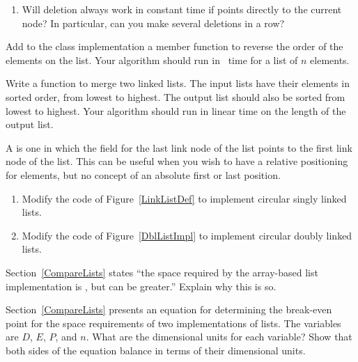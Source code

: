 \begin{exercises}
\begin{enumerate}
\item
Will deletion always work in constant time if  points
directly to the current node?
In particular, can you make several deletions in a row?

\end{enumerate}

\item
Add to the  class implementation a member function
to reverse the order of the elements on the list.
Your algorithm should run in \Thetan\ time for a list of $n$
elements.

\item
Write a function to merge two linked lists.
The input lists have their elements in sorted order, from lowest to
highest.
The output list should also be sorted from lowest to highest.
Your algorithm should run in linear time on the length of the output
list.

\item
A  is one in which the  field
for the last link node of the list points to the first link node of
the list.
This can be useful when you wish to have a relative positioning
for elements, but no concept of an absolute first or last position.
\begin{enumerate}
\item
Modify the code of Figure~\ref{LinkListDef} to implement
circular singly linked lists.

\item
Modify the code of Figure~\ref{DblListImpl} to implement circular
doubly linked lists.
\end{enumerate}

\item
Section~\ref{CompareLists} states ``the space required by the
array-based list implementation is \Omegan, but can be greater.''
Explain why this is so.

\item
Section~\ref{CompareLists} presents an equation for determining the
break-even point for the space requirements of two implementations of
lists.
The variables are $D$, $E$, $P$, and $n$.
What are the dimensional units for each variable?
Show that both sides of the equation balance in terms of their
dimensional units.


\end{exercises}
